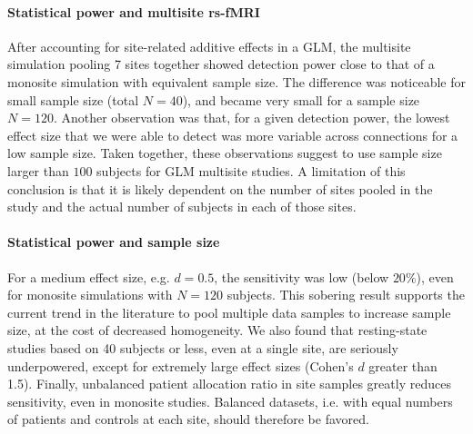\documentclass[authoryear]{elsarticle}
\begin{document}
\paragraph{Statistical power and multisite rs-fMRI} After accounting for site-related additive effects in a GLM, the multisite simulation pooling 7 sites together showed detection power close to that of a monosite simulation with equivalent sample size. The difference was noticeable for small sample size (total $N=40$), and became very small for a sample size $N=120$. Another observation was that, for a given detection power, the lowest effect size that we were able to detect was more variable across connections for a low sample size. Taken together, these observations suggest to use sample size larger than $100$ subjects for GLM multisite studies. A limitation of this conclusion is that it is likely dependent on the number of sites pooled in the study and the actual number of subjects in each of those sites. 

\paragraph{Statistical power and sample size} For a medium effect size, e.g. $d=0.5$, the sensitivity was low (below $20\%$), even for monosite simulations with $N=120$ subjects. This sobering result supports the current trend in the literature to pool multiple data samples to increase sample size, at the cost of decreased homogeneity. We also found that resting-state studies based on 40 subjects or less, even at a single site, are seriously underpowered, except for extremely large effect sizes (Cohen's $d$ greater than 1.5). Finally, unbalanced patient allocation ratio in site samples greatly reduces sensitivity, even in monosite studies. Balanced datasets, i.e. with equal numbers of patients and controls at each site, should therefore be favored. 
\end{document}
